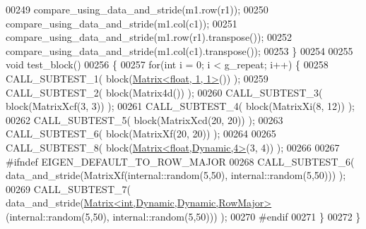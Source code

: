 \begin{DoxyCode}
00249   compare\_using\_data\_and\_stride(m1.row(r1));
00250   compare\_using\_data\_and\_stride(m1.col(c1));
00251   compare\_using\_data\_and\_stride(m1.row(r1).transpose());
00252   compare\_using\_data\_and\_stride(m1.col(c1).transpose());
00253 \}
00254 
00255 \textcolor{keywordtype}{void} test\_block()
00256 \{
00257   \textcolor{keywordflow}{for}(\textcolor{keywordtype}{int} i = 0; i < g\_repeat; i++) \{
00258     CALL\_SUBTEST\_1( block(\hyperlink{group___core___module_class_eigen_1_1_matrix}{Matrix<float, 1, 1>}()) );
00259     CALL\_SUBTEST\_2( block(Matrix4d()) );
00260     CALL\_SUBTEST\_3( block(MatrixXcf(3, 3)) );
00261     CALL\_SUBTEST\_4( block(MatrixXi(8, 12)) );
00262     CALL\_SUBTEST\_5( block(MatrixXcd(20, 20)) );
00263     CALL\_SUBTEST\_6( block(MatrixXf(20, 20)) );
00264 
00265     CALL\_SUBTEST\_8( block(\hyperlink{group___core___module_class_eigen_1_1_matrix}{Matrix<float,Dynamic,4>}(3, 4)) );
00266 
00267 \textcolor{preprocessor}{#ifndef EIGEN\_DEFAULT\_TO\_ROW\_MAJOR}
00268     CALL\_SUBTEST\_6( data\_and\_stride(MatrixXf(internal::random(5,50), internal::random(5,50))) );
00269     CALL\_SUBTEST\_7( data\_and\_stride(\hyperlink{group___core___module_class_eigen_1_1_matrix}{Matrix<int,Dynamic,Dynamic,RowMajor>}
      (internal::random(5,50), internal::random(5,50))) );
00270 \textcolor{preprocessor}{#endif}
00271   \}
00272 \}
\end{DoxyCode}
